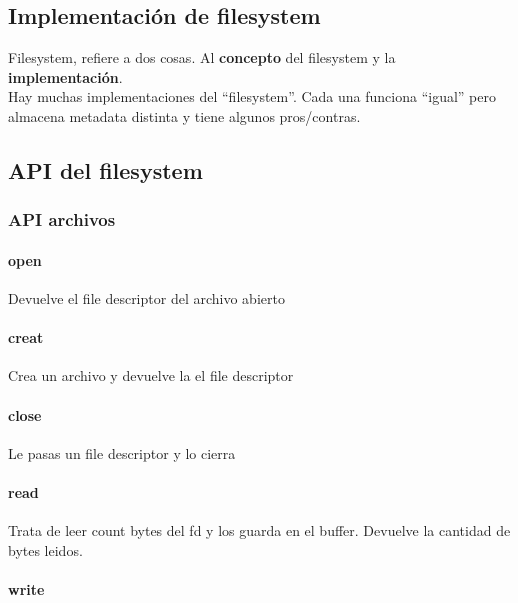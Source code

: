 \documentclass{article}
\begin{document}
\subsection{Implementación de
filesystem}\label{implementaciuxf3n-de-filesystem}

Filesystem, refiere a dos cosas. Al \textbf{concepto} del filesystem y
la \textbf{implementación}.\\
Hay muchas implementaciones del ``filesystem''. Cada una funciona
``igual'' pero almacena metadata distinta y tiene algunos pros/contras.

\subsection{API del filesystem}\label{api-del-filesystem}

\subsubsection{API archivos}\label{api-archivos}

\paragraph{open}\label{open}

Devuelve el file descriptor del archivo abierto

\paragraph{creat}\label{creat}

Crea un archivo y devuelve la el file descriptor

\paragraph{close}\label{close}

Le pasas un file descriptor y lo cierra

\paragraph{read}\label{read}

Trata de leer count bytes del fd y los guarda en el buffer. Devuelve la
cantidad de bytes leidos.

\paragraph{write}\label{write}
\end{document}
